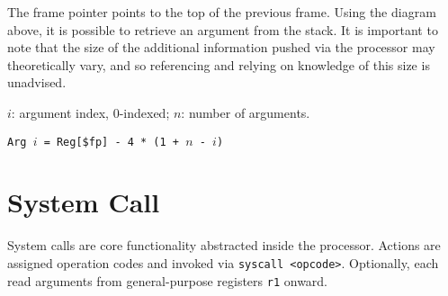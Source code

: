 \documentclass{article}
\begin{document}
The frame pointer points to the top of the previous frame.
Using the diagram above, it is possible to retrieve an argument from the stack.
It is important to note that the size of the additional information pushed via the processor may theoretically vary, and so referencing and relying on knowledge of this size is unadvised.

\begin{center}
    \(i\): argument index, 0-indexed; \(n\): number of arguments.
    
    \texttt{Arg \(i\) = Reg[\$fp] - 4 * (1 + \(n\) - \(i\))}
\end{center}

\section{System Call}

System calls are core functionality abstracted inside the processor.
Actions are assigned operation codes and invoked via \texttt{syscall <opcode>}.
Optionally, each read arguments from general-purpose registers \texttt{r1} onward.
\end{document}
